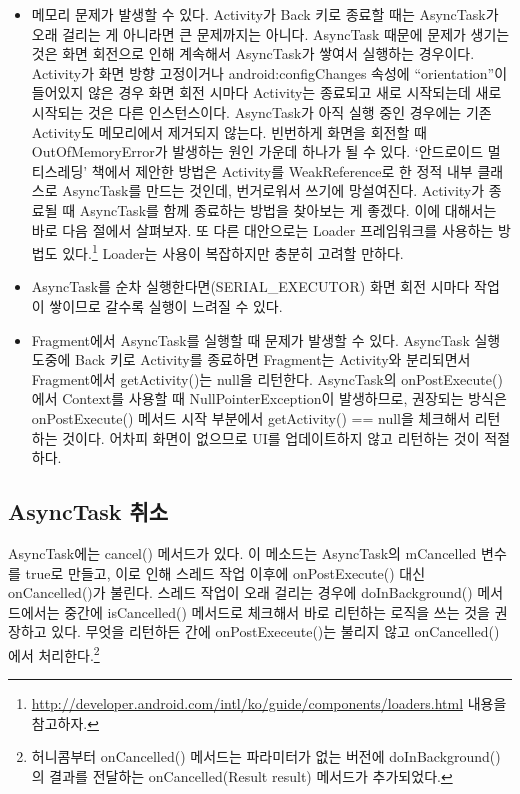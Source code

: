\begin{itemize}
\item 메모리 문제가 발생할 수 있다. Activity가 Back 키로 종료할 때는 AsyncTask가 오래 걸리는 게 아니라면 큰 문제까지는 아니다. 
AsyncTask 때문에 문제가 생기는 것은 화면 회전으로 인해 계속해서 AsyncTask가 쌓여서 실행하는 경우이다.
Activity가 화면 방향 고정이거나 android:configChanges 속성에 ``orientation''이 들어있지 않은 경우 화면 회전 시마다 Activity는 종료되고 새로 시작되는데 새로 시작되는 것은 다른 인스턴스이다. 
AsyncTask가 아직 실행 중인 경우에는 기존 Activity도 메모리에서 제거되지 않는다. 빈번하게 화면을 회전할 때 OutOfMemoryError가 발생하는 원인 가운데 하나가 될 수 있다.
`안드로이드 멀티스레딩' 책에서 제안한 방법은 Activity를 WeakReference로 한 정적 내부 클래스로 AsyncTask를 만드는 것인데, 번거로워서 쓰기에 망설여진다. Activity가 종료될 때 AsyncTask를 함께 종료하는 방법을 찾아보는 게 좋겠다. 이에 대해서는 바로 다음 절에서 살펴보자.  
또 다른 대안으로는 Loader 프레임워크를 사용하는 방법도 있다.\footnote{\url{http://developer.android.com/intl/ko/guide/components/loaders.html} 내용을 참고하자.}
Loader는 사용이 복잡하지만 충분히 고려할 만하다. 

\item AsyncTask를 순차 실행한다면(SERIAL\_EXECUTOR) 화면 회전 시마다 작업이 쌓이므로 갈수록 실행이 느려질 수 있다.

\item Fragment에서 AsyncTask를 실행할 때 문제가 발생할 수 있다. AsyncTask 실행 도중에 Back 키로 Activity를 종료하면 Fragment는 Activity와 분리되면서 Fragment에서 getActivity()는 null을 리턴한다. AsyncTask의 onPostExecute()에서 Context를 사용할 때 NullPointerException이 발생하므로, 권장되는 방식은 onPostExecute() 메서드 시작 부분에서 getActivity() == null을 체크해서 리턴하는 것이다. 어차피 화면이 없으므로 UI를 업데이트하지 않고 리턴하는 것이 적절하다. 
\end{itemize}

\subsection{AsyncTask 취소}
AsyncTask에는 cancel() 메서드가 있다. 이 메소드는 AsyncTask의 mCancelled 변수를 true로 만들고, 이로 인해 스레드 작업 이후에 onPostExecute() 대신 onCancelled()가 불린다. 스레드 작업이 오래 걸리는 경우에 doInBackground() 메서드에서는 중간에 isCancelled() 메서드로 체크해서 바로 리턴하는 로직을 쓰는 것을 권장하고 있다. 무엇을 리턴하든 간에 onPostExeceute()는 불리지 않고 onCancelled()에서 처리한다.\footnote{허니콤부터 onCancelled() 메서드는 파라미터가 없는 버전에 doInBackground()의 결과를 전달하는 onCancelled(Result result) 메서드가 추가되었다.}\\

